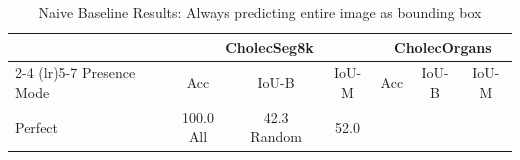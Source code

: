 
\begin{table}[htbp]
\centering
\caption{Naive Baseline Results: Always predicting entire image as bounding box}
\begin{tabular}{lcccccc}
\toprule
& \multicolumn{3}{c}{CholecSeg8k} & \multicolumn{3}{c}{CholecOrgans} \\
\cmidrule(lr){2-4} \cmidrule(lr){5-7}
Presence Mode & Acc & IoU-B & IoU-M & Acc & IoU-B & IoU-M \\
\midrule
Perfect & 100.0%
All & 42.3%
Random & 52.0%
\bottomrule
\end{tabular}
\end{table}
